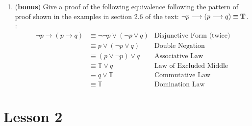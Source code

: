 \documentclass[11pt]{amsart}
\begin{document}
\begin{enumerate}
\item ({\bf bonus}) Give a proof of the following equivalence following the pattern
of proof shown in the examples in section 2.6 of the text:  $\neg p\longrightarrow(p\longrightarrow q)\equiv {\bf T}$.\\[10pt]
{\color{blue}:
\begin{align*}
\lnot p\rightarrow (p\rightarrow q)
& \equiv \lnot\lnot p \lor  (\lnot p\lor q)         &\text{Disjunctive Form (twice)}\\
&\equiv p \lor (\lnot p\lor q)                           &\text{Double Negation}\\
&\equiv (p\lor \lnot p)\lor q                            &\text{Associative Law}\\
&\equiv {\mathbb T} \lor q                              &\text{Law of Excluded Middle}\\
&\equiv q \lor {\mathbb T}                              &\text{Commutative Law}\\
&\equiv {\mathbb T}                                        &\text{Domination Law}
\end{align*}
}

\end{enumerate}

\section{Lesson 2}
\end{document}
